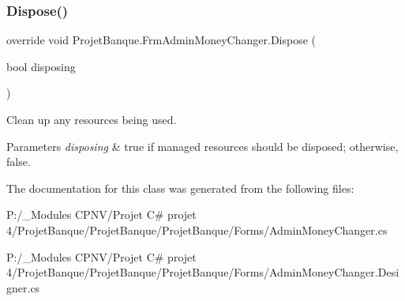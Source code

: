 \subsubsection{\texorpdfstring{Dispose()}{Dispose()}}
{\footnotesize\ttfamily override void Projet\+Banque.\+Frm\+Admin\+Money\+Changer.\+Dispose (\begin{DoxyParamCaption}\item[{bool}]{disposing }\end{DoxyParamCaption})\hspace{0.3cm}{\ttfamily [protected]}}



Clean up any resources being used. 


\begin{DoxyParams}{Parameters}
{\em disposing} & true if managed resources should be disposed; otherwise, false.\\
\hline
\end{DoxyParams}


The documentation for this class was generated from the following files\+:\begin{DoxyCompactItemize}
\item 
P\+:/\+\_\+\+Modules C\+P\+N\+V/\+Projet C\# projet 4/\+Projet\+Banque/\+Projet\+Banque/\+Projet\+Banque/\+Forms/Admin\+Money\+Changer.\+cs\item 
P\+:/\+\_\+\+Modules C\+P\+N\+V/\+Projet C\# projet 4/\+Projet\+Banque/\+Projet\+Banque/\+Projet\+Banque/\+Forms/Admin\+Money\+Changer.\+Designer.\+cs\end{DoxyCompactItemize}
